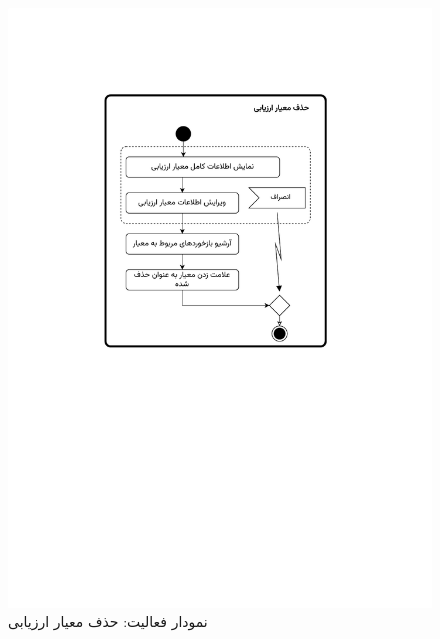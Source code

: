 \begin{figure}[ht!]
	\centering
	\includegraphics[scale=0.8, page=1]{figs/OOD-activity31-35.pdf}
	\caption{نمودار فعالیت: حذف معیار ارزیابی}
\end{figure}
\FloatBarrier
\newpage

